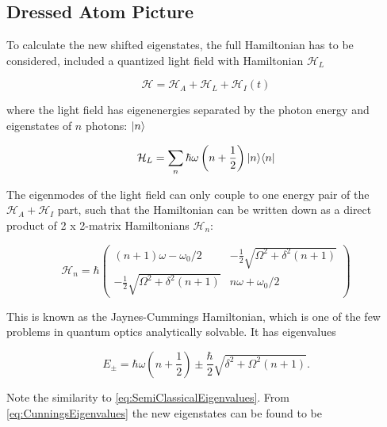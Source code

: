 \subsection{Dressed Atom Picture}\label{sec:DressedApproach}

To calculate the new shifted eigenstates, the full Hamiltonian has to be considered, included a quantized light field with Hamiltonian $\mathcal{H}_L$ \cite{Dalibard1985}

\begin{equation}
	\mathcal{H} = \mathcal{H}_A + \mathcal{H}_L + \mathcal{H}_I(t)
\end{equation}

where the light field has eigenenergies separated by the photon energy and eigenstates of $n$ photons: $\lvert n\rangle$ \cite{Vredenbregt2020}

\begin{equation}\label{eq:RadiationModes}
	\mathcal{H}_L = \sum_n \hbar \omega \left(n+\frac{1}{2}\right) \lvert n\rangle\langle n\rvert
\end{equation}

The eigenmodes of the light field can only couple to one energy pair of the $\mathcal{H}_A + \mathcal{H}_I$ part, such that the Hamiltonian can be written down as a direct product of 2 x 2-matrix Hamiltonians \cite{Vredenbregt2020,Hussin2005} $\mathcal{H}_n$:

\begin{equation}\label{eq:CunningsHamiltonian}
    \mathcal{H}_n = \hbar 
    \begin{pmatrix}
        (n + 1)\omega -\omega_0 / 2                     & -\frac{1}{2}\sqrt{\Omega^2+\delta^2(n+1)} \\
        -\frac{1}{2}\sqrt{\Omega^2 + \delta^2(n+1)}  & n\omega + \omega_0/2
    \end{pmatrix}
\end{equation}

This is known as the Jaynes-Cummings Hamiltonian, which is one of the few problems in quantum optics analytically solvable.
It has eigenvalues \cite{Hussin2005}

\begin{equation}\label{eq:CunningsEigenvalues}
    E_{\pm} = \hbar\omega\left(n+\frac{1}{2}\right) \pm \frac{\hbar}{2} \sqrt{\delta^2 + \Omega^2(n+1)}.
\end{equation}

Note the similarity to \cref{eq:SemiClassicalEigenvalues}. From \cref{eq:CunningsEigenvalues} the new eigenstates can be found to be \cite{Hussin2005}

